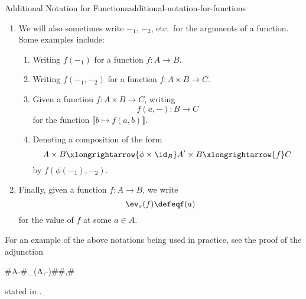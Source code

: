 \begin{notation}{Additional Notation for Functions}{additional-notation-for-functions}
\begin{enumerate}
\begin{enumerate}
                \item Function evaluations, cf.:
                    \begin{enumerate}
                        \item $\Phi(\llbracket x\mapsto f(x)\rrbracket)$%
                        \item $\Phi((x\mapsto f(x)))$%
                        \item $\Phi((\lambda x.\ f(x)))$%
                    \end{enumerate}
            \end{enumerate}
        \item We will also sometimes write $-_{1}$, $-_{2}$, etc.\ for the arguments of a function. Some examples include:
            \begin{enumerate}
                \item Writing $f(-_{1})$ for a function $f\colon A\to B$.
                \item Writing $f(-_{1},-_{2})$ for a function $f\colon A\times B\to C$.
                \item Given a function $f\colon A\times B\to C$, writing
                    \[
                        f(a,-)%
                        \colon%
                        B%
                        \to%
                        C%
                    \]%
                    for the function $\llbracket b\mapsto f(a,b)\rrbracket$.
                \item Denoting a composition of the form%
                    \[
                        A\times B%
                        \xlongrightarrow{\phi\times\id_{B}}%
                        A'\times B%
                        \xlongrightarrow{f}%
                        C%
                    \]%
                    by $f(\phi(-_{1}),-_{2})$.
            \end{enumerate}
        \item Finally, given a function $f\colon A\to B$, we write
            \[
                \ev_{a}(f)%
                \defeq%
                f(a)%
            \]%
            for the value of $f$ at some $a\in A$.
    \end{enumerate}
    For an example of the above notations being used in practice, see the proof of the adjunction
    \begin{webcompile}
        \AdjunctionShort#A\times -#{\Hom_{\Sets}(A,-)}#\Sets#\Sets,#
    \end{webcompile}
    stated in .
\end{notation}
